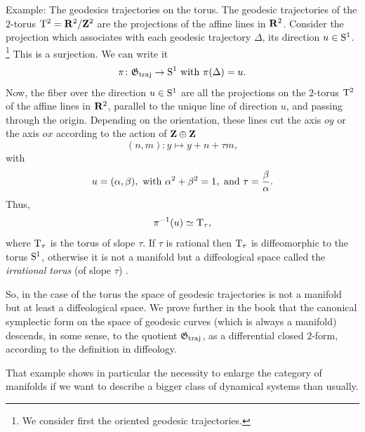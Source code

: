 \begin{Article}{Example: The geodesics trajectories on the torus.}{}
  The geodesic trajectories of the $2$-torus $\mathrm{T}^2 = \mathbf{R}^2/\mathbf{Z}^2$ are the projections of the affine lines in $\mathbf{R}^2$.
  Consider the projection which associates with each geodesic trajectory $\Delta$,
  its direction $u \in \mathrm{S}^1$.%
  \footnote{We consider first the oriented geodesic trajectories.}
  This is a surjection.
  We can write it
  $$%
    \pi \colon \fG_{\traj} \to \Sph^1
    \SpacedText{with} \pi(\Delta) = u.
    $$%
  Now,
  the fiber over the direction $u \in \mathrm{S}^1$ are all the projections on the $2$-torus $\mathrm{T}^2$ of the affine lines in $\mathbf{R}^2$,
  parallel to the unique line of direction $u$,
  and passing through the origin.
  Depending on the orientation,
  these lines cut the axis $oy$ or the axis $ox$ according to the action of $\mathbf{Z} \oplus \mathbf{Z}$
  $$%
    (n,m) \colon y \mapsto y + n + \tau m,
    $$%
  with
  $$%
    u = (\alpha,\beta),
    \text{ with } \alpha^2 + \beta^2 = 1,
    \text{ and } \tau = {\beta \over \alpha}.
    $$%
  Thus,
  $$%
    \pi^{-1}(u) \simeq \Torus_\tau,
    $$%
  where $\mathrm{T}_\tau$ is the torus of slope $\tau$.
  If $\tau$ is rational then $\mathrm{T}_\tau$ is diffeomorphic to the torus $\mathrm{S}^1$,
  otherwise it is not a manifold but a diffeological space called the \emph{irrational torus} (of slope $\tau$) \cite{DI83}.
  
  So,
  in the case of the torus the space of geodesic trajectories is not a manifold but at least a diffeological space.
  We prove further in the book that the canonical symplectic form on the space of geodesic curves (which is always a manifold) descends,
  in some sense,
  to the quotient ${\mathfrak G}_{\mathrm{traj}}$,
  as a differential closed $2$-form,
  according to the definition in diffeology.
  
  That example shows in particular the necessity to enlarge the category of manifolds if we want to describe a bigger class of dynamical systems than usually.
\end{Article}

